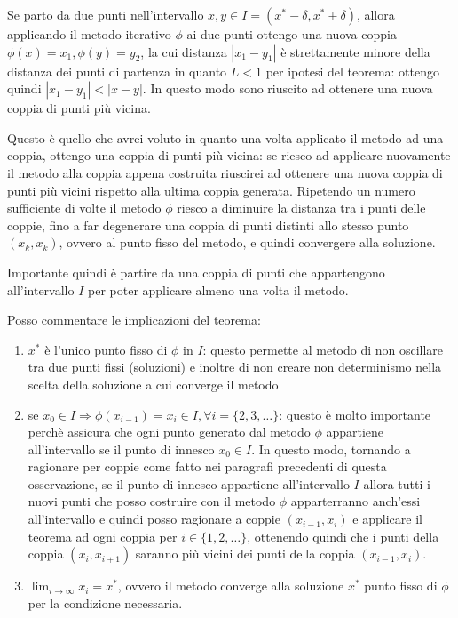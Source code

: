\begin{oss}
Se parto da due punti nell'intervallo $x, y \in I = (x^{*} - \delta, x^{*} +
\delta)$, allora applicando il metodo iterativo $\phi$ ai due punti ottengo una
nuova coppia $\phi(x) = x_{1}, \phi(y) = y_{2}$, la cui distanza $|x_{1} - y_{1}|$
\`e strettamente minore della distanza dei punti di partenza in quanto $L < 1$
per ipotesi del teorema: ottengo quindi $|x_{1} - y_{1}| < |x - y|$. In questo
modo sono riuscito ad ottenere una nuova coppia di punti pi\`u vicina.

Questo \`e quello che avrei voluto in quanto una volta applicato il metodo ad
una coppia, ottengo una coppia di punti pi\`u vicina: se riesco ad applicare
nuovamente il metodo alla coppia appena costruita riuscirei ad ottenere una
nuova coppia di punti pi\`u vicini rispetto alla ultima coppia generata.
Ripetendo un numero sufficiente di volte il metodo $\phi$ riesco a diminuire la
distanza tra i punti delle coppie, fino a far degenerare una coppia di punti
distinti allo stesso punto $(x_{k}, x_{k})$, ovvero al punto fisso del metodo,
e quindi convergere alla soluzione.

Importante quindi \`e partire da una coppia di punti che appartengono
all'intervallo $I$ per poter applicare almeno una volta il metodo.

Posso commentare le implicazioni del teorema:
\begin{enumerate}
  \item $x^{*}$ \`e l'unico punto fisso di $\phi$ in $I$: questo permette al
  metodo di non oscillare tra due punti fissi (soluzioni) e inoltre di non
  creare non determinismo nella scelta della soluzione a cui converge il metodo
  \item se $x_{0} \in I \Rightarrow \phi(x_{i-1}) = x_{i} \in I, \forall i =
  \{2, 3, \ldots\}$: questo \`e molto importante perch\`e assicura che ogni
  punto generato dal metodo $\phi$ appartiene all'intervallo se il punto di
  innesco $x_{0} \in I$. In questo modo, tornando a ragionare per coppie come
  fatto nei paragrafi precedenti di questa osservazione, se il punto di innesco
  appartiene all'intervallo $I$ allora tutti i nuovi punti che posso costruire
  con il metodo $\phi$ apparterranno anch'essi all'intervallo e quindi posso 
  ragionare a coppie $(x_{i-1}, x_{i})$ e applicare il teorema ad ogni coppia
  per $i \in \{ 1, 2,\ldots \}$, ottenendo quindi che i punti della coppia
  $(x_{i}, x_{i+1})$ saranno pi\`u vicini dei punti della coppia $(x_{i-1},
  x_{i})$.
  \item $\lim_{i \rightarrow \infty}{x_{i}} = x^{*}$, ovvero il metodo converge
  alla soluzione $x^{*}$ punto fisso di $\phi$ per la condizione necessaria.
\end{enumerate}
\end{oss}
